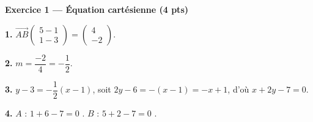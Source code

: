 %
%
%
%
%


\textbf{Exercice 1 — Équation cartésienne (4 pts)}


\textbf{1.} $\vec{AB}\begin{pmatrix} 5-1 \\ 1-3 \end{pmatrix} = \begin{pmatrix} 4 \\ -2 \end{pmatrix}$.

\textbf{2.} $m = \dfrac{-2}{4} = -\dfrac{1}{2}$.

\textbf{3.} $y - 3 = -\dfrac{1}{2}(x - 1)$, soit $2y - 6 = -(x-1) = -x + 1$, d'où $x + 2y - 7 = 0$.

\textbf{4.} $A$ : $1 + 6 - 7 = 0$ \checkmark. $B$ : $5 + 2 - 7 = 0$ \checkmark.

